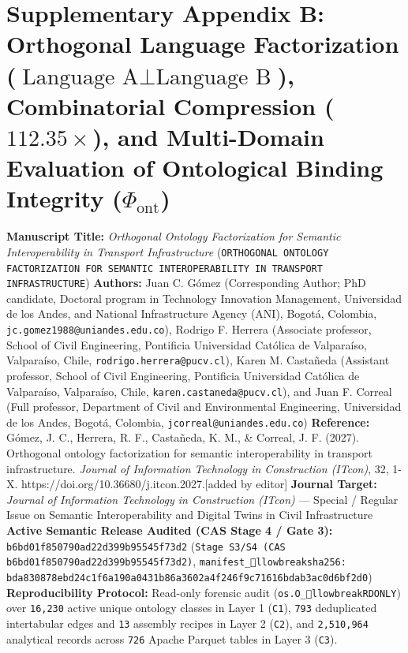 \documentclass[10pt,a4paper]{article}
\begin{document}
\section*{Supplementary Appendix B: Orthogonal Language Factorization ($\text{Language A} \perp \text{Language B}$), Combinatorial Compression ($112.35\times$), and Multi-Domain Evaluation of Ontological Binding Integrity ($\Phi_{\text{ont}}$)}

\textbf{Manuscript Title:} \textit{Orthogonal Ontology Factorization for Semantic Interoperability in Transport Infrastructure} (\texttt{ORTHOGONAL ONTOLOGY FACTORIZATION FOR SEMANTIC INTEROPERABILITY IN TRANSPORT INFRASTRUCTURE})
\textbf{Authors:} Juan C. Gómez (Corresponding Author; PhD candidate, Doctoral program in Technology Innovation Management, Universidad de los Andes, and National Infrastructure Agency (ANI), Bogotá, Colombia, \texttt{jc.gomez1988@uniandes.edu.co}), Rodrigo F. Herrera (Associate professor, School of Civil Engineering, Pontificia Universidad Católica de Valparaíso, Valparaíso, Chile, \texttt{rodrigo.herrera@pucv.cl}), Karen M. Castañeda (Assistant professor, School of Civil Engineering, Pontificia Universidad Católica de Valparaíso, Valparaíso, Chile, \texttt{karen.castaneda@pucv.cl}), and Juan F. Correal (Full professor, Department of Civil and Environmental Engineering, Universidad de los Andes, Bogotá, Colombia, \texttt{jcorreal@uniandes.edu.co})
\textbf{Reference:} Gómez, J. C., Herrera, R. F., Castañeda, K. M., \& Correal, J. F. (2027). Orthogonal ontology factorization for semantic interoperability in transport infrastructure. \textit{Journal of Information Technology in Construction (ITcon)}, 32, 1-X. https://doi.org/10.36680/j.itcon.2027.[added by editor]
\textbf{Journal Target:} \textit{Journal of Information Technology in Construction (ITcon)} --- Special / Regular Issue on Semantic Interoperability and Digital Twins in Civil Infrastructure
\textbf{Active Semantic Release Audited (CAS Stage 4 / Gate 3):} \texttt{b6bd01f850790ad22d399b95545f73d2} (\texttt{Stage S3/S4 (CAS b6bd01f850790ad22d399b95545f73d2)}, \texttt{manifest\_llowbreak{}sha256: bda830878ebd24c1f6a190a0431b86a3602a4f246f9c71616bdab3ac0d6bf2d0})
\textbf{Reproducibility Protocol:} Read-only forensic audit (\texttt{os.O\_llowbreak{}RDONLY}) over \texttt{16,230} active unique ontology classes in Layer 1 (\texttt{C1}), \texttt{793} deduplicated intertabular edges and \texttt{13} assembly recipes in Layer 2 (\texttt{C2}), and \texttt{2,510,964} analytical records across \texttt{726} Apache Parquet tables in Layer 3 (\texttt{C3}).
\end{document}
